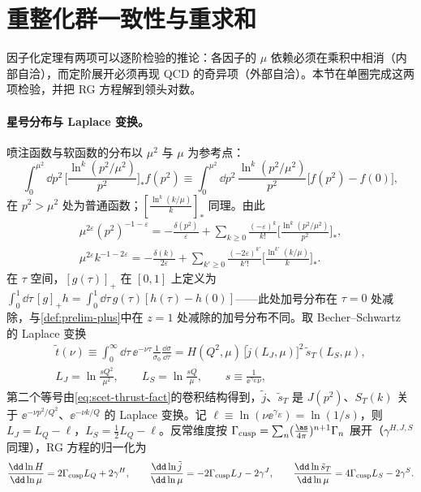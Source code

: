 \section{重整化群一致性与重求和}\label{sec:scet-rg}

因子化定理有两项可以逐阶检验的推论：各因子的 $\mu$ 依赖必须在乘积中相消（内部自洽），而定阶展开必须再现 QCD 的奇异项（外部自洽）。本节在单圈完成这两项检验，并把 RG 方程解到领头对数。

\paragraph{星号分布与 Laplace 变换。}
喷注函数与软函数的分布以 $\mu^2$ 与 $\mu$ 为参考点：
\[
\int_0^{\mu^2}\dd p^2\,\Big[\frac{\ln^k(p^2/\mu^2)}{p^2}\Big]_*f(p^2)\equiv\int_0^{\mu^2}\dd p^2\,\frac{\ln^k(p^2/\mu^2)}{p^2}\big[f(p^2)-f(0)\big],
\]
在 $p^2>\mu^2$ 处为普通函数；$[\frac{\ln^k(k/\mu)}{k}]_*$ 同理。由此
\begin{equation}\label{eq:scet-distid}
\begin{gathered}
\mu^{2\varepsilon}(p^2)^{-1-\varepsilon}=-\frac{\delta(p^2)}{\varepsilon}+\sum_{k\ge0}\frac{(-\varepsilon)^k}{k!}\Big[\frac{\ln^k(p^2/\mu^2)}{p^2}\Big]_*,\\
\mu^{2\varepsilon}k^{-1-2\varepsilon}=-\frac{\delta(k)}{2\varepsilon}+\sum_{k'\ge0}\frac{(-2\varepsilon)^{k'}}{k'!}\Big[\frac{\ln^{k'}(k/\mu)}{k}\Big]_* .
\end{gathered}
\end{equation}
在 $\tau$ 空间，$[g(\tau)]_+$ 在 $[0,1]$ 上定义为 $\int_0^1\dd\tau\,[g]_+h=\int_0^1\dd\tau\,g(\tau)[h(\tau)-h(0)]$——此处加号分布在 $\tau=0$ 处减除，与\cref{def:prelim-plus}中在 $z=1$ 处减除的加号分布不同。取 Becher--Schwartz 的 Laplace 变换\cite[附录~B]{BecherSchwartz2008}
\begin{equation}\label{eq:scet-laplace}
\begin{gathered}
\tilde t(\nu)\equiv\int_0^\infty\dd\tau\,\ee^{-\nu\tau}\frac{1}{\sigma_0}\frac{\dd\sigma}{\dd\tau}=H(Q^2,\mu)\,\big[\tilde j(L_J,\mu)\big]^2\,\tilde s_T(L_S,\mu),\\
L_J=\ln\frac{sQ^2}{\mu^2},\qquad L_S=\ln\frac{sQ}{\mu},\qquad s\equiv\frac{1}{\ee^{\gamma_E}\nu},
\end{gathered}
\end{equation}
第二个等号由\cref{eq:scet-thrust-fact}的卷积结构得到，$\tilde j$、$\tilde s_T$ 是 $J(p^2)$、$S_T(k)$ 关于 $\ee^{-\nu p^2/Q^2}$、$\ee^{-\nu k/Q}$ 的 Laplace 变换。记 $\ell\equiv\ln(\nu\ee^{\gamma_E})=\ln(1/s)$，则 $L_J=L_Q-\ell$，$L_S=\frac12L_Q-\ell$。反常维度按 $\Gamma_{\rm cusp}=\sum_n(\frac{\as}{4\pi})^{n+1}\Gamma_n$ 展开（$\gamma^{H,J,S}$ 同理），RG 方程的归一化为
\begin{equation}\label{eq:scet-RGE}
\frac{\dd\ln H}{\dd\ln\mu}=2\Gamma_{\rm cusp}L_Q+2\gamma^H,\qquad
\frac{\dd\ln\tilde j}{\dd\ln\mu}=-2\Gamma_{\rm cusp}L_J-2\gamma^J,\qquad
\frac{\dd\ln\tilde s_T}{\dd\ln\mu}=4\Gamma_{\rm cusp}L_S-2\gamma^S .
\end{equation}

